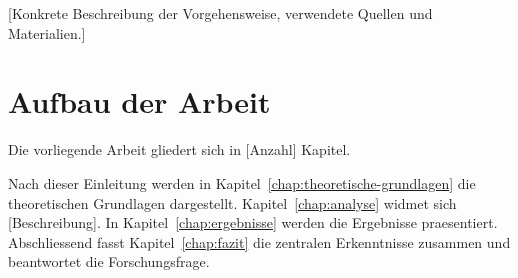 
[Konkrete Beschreibung der Vorgehensweise, verwendete Quellen und
Materialien.]


\section{Aufbau der Arbeit}
\label{sec:aufbau}

Die vorliegende Arbeit gliedert sich in [Anzahl] Kapitel.

Nach dieser Einleitung werden in Kapitel~\ref{chap:theoretische-grundlagen}
die theoretischen Grundlagen dargestellt. Kapitel~\ref{chap:analyse}
widmet sich [Beschreibung]. In Kapitel~\ref{chap:ergebnisse} werden
die Ergebnisse praesentiert. Abschliessend fasst Kapitel~\ref{chap:fazit}
die zentralen Erkenntnisse zusammen und beantwortet die Forschungsfrage.
